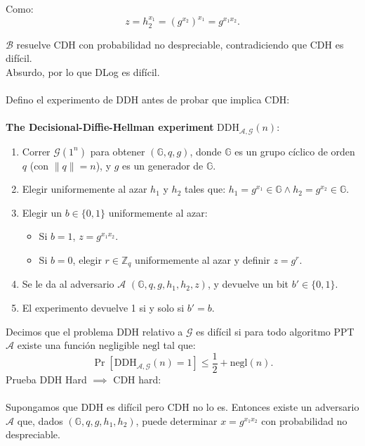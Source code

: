 \documentclass[12pt,addpoints,answers]{exam}
\begin{document}
\begin{questions}
\begin{solution}
    Como:
    \[
    z = h_2^{x_1} = (g^{x_2})^{x_1} = g^{x_1 x_2}.
    \]
    
    $\mathcal{B}$ resuelve CDH con probabilidad no despreciable, contradiciendo que CDH es difícil. \\
    
    Absurdo, por lo que DLog es difícil. \\ \\ 
    
    Defino el experimento de DDH antes de probar que implica CDH: \\ \\
    \textbf{The Decisional-Diffie-Hellman experiment} $\text{DDH}_{\mathcal{A},\mathcal{G}}(n)$:
    \begin{enumerate}
        \item Correr $\mathcal{G}(1^n)$ para obtener $(\mathbb{G}, q, g)$, donde $\mathbb{G}$ es un grupo cíclico de orden $q$ (con $\|q\| = n$), y $g$ es un generador de $\mathbb{G}$.
        \item Elegir uniformemente al azar $h_1$ y $h_2$ tales que: $h_1 = g^{x_1} \in \mathbb{G} \land h_2 = g^{x_2} \in \mathbb{G}$.
        \item Elegir un $b \in \{0,1\}$ uniformemente al azar:
        \begin{itemize}
            \item Si $b = 1$, $z = g^{x_1 x_2}$.
            \item Si $b = 0$, elegir $r \in \mathbb{Z}_q$ uniformemente al azar y definir $z = g^r$.
        \end{itemize}
        \item Se le da al adversario $\mathcal{A}$ $(\mathbb{G}, q, g, h_1, h_2, z)$, y devuelve un bit $b' \in \{0,1\}$.
        \item El experimento devuelve 1 si y solo si $b' = b$.
    \end{enumerate}
    
    Decimos que el problema DDH relativo a $\mathcal{G}$ es difícil si para todo algoritmo PPT $\mathcal{A}$ existe una función negligible $\text{negl}$ tal que:
    \[
    \Pr[\text{DDH}_{\mathcal{A},\mathcal{G}}(n) = 1] \leq \frac{1}{2} + \text{negl}(n).
    \] 
    Prueba DDH Hard $\implies$ CDH hard: \\ \\ 
    Supongamos que DDH es difícil pero CDH no lo es. 
    Entonces existe un adversario $\mathcal{A}$ que, dados $(\mathbb{G}, q, g, h_1, h_2)$, puede determinar $x = g^{x_1x_2}$ con probabilidad no despreciable. \\


\end{solution}
\end{questions}
\end{document}
